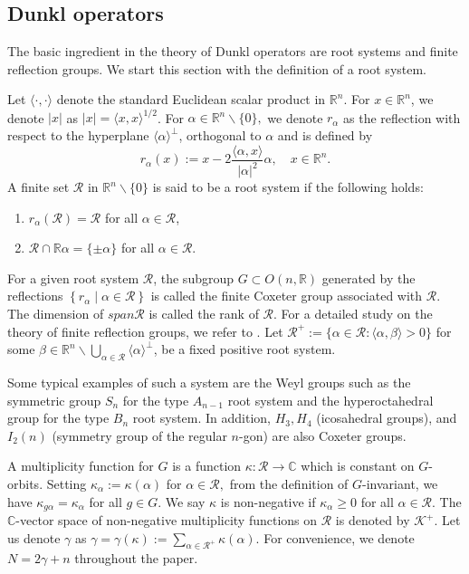 \documentclass[a4paper,11pt, reqno]{amsart}
\numberwithin{equation}{section}
\theoremstyle{plain}
\theoremstyle{definition}
\theoremstyle{remark}
\begin{document}
	\subsection{Dunkl operators}\label{dunklop} The basic ingredient in the theory of Dunkl operators are root systems and finite reflection groups. We start this section with the definition of a root system. 
 
 Let $\langle\cdot, \cdot\rangle$  denote the standard Euclidean scalar product in $\mathbb{R}^{n}$. For $x \in \mathbb{R}^{n}$, we denote $|x|$ as $|x|=\langle x, x\rangle^{1 / 2}$.
	For $\alpha \in \mathbb{R}^{n} \backslash\{0\},$ we denote $r_{\alpha}$ as the reflection with respect to the hyperplane $\langle \alpha\rangle^{\perp}$, orthogonal to $\alpha$ and is defined by
	$$
	r_{\alpha}(x):=x-2 \frac{\langle \alpha, x\rangle}{|\alpha|^{2}} \alpha, \quad x \in \mathbb{R}^n.
	$$
	A finite set $\mathcal{R}$ in $\mathbb{R}^{n} \backslash\{0\}$ is  said to be a root system if the following holds:
	\begin{enumerate}
		\item $ r_{\alpha}(\mathcal{R})=\mathcal{R}$ for all $\alpha \in \mathcal{R}$,
		\item $\mathcal{R} \cap \mathbb{R} \alpha=\{\pm \alpha\}$ for all $\alpha \in \mathcal{R}$.
	\end{enumerate}
	For a given root system $\mathcal{R}$, the subgroup $G \subset O(n, \mathbb{R})$ generated by the reflections $\left\{r_{\alpha} \mid \alpha \in \mathcal{R}\right\}$ is called the finite Coxeter group associated with $\mathcal{R}$.  The dimension of $span \mathcal{R}$ is called the rank of $\mathcal{R}$.   For a detailed study on the theory of finite reflection groups, we refer to \cite{hum}. Let $\mathcal{R}^+:=\{\alpha\in\mathcal{R}:\langle\alpha,\beta\rangle>0\}$ for some $\beta\in\mathbb{R}^n\backslash\bigcup_{\alpha\in\mathcal{R}}\langle \alpha\rangle^{\perp}$,  be a fixed positive root system.  
	
	
	Some typical examples of such a system are the Weyl groups such as the symmetric group $S_{n}$ for the type $A_{n-1}$ root system and the hyperoctahedral group for the type $B_{n}$ root system. In addition, $H_{3}, H_{4}$ (icosahedral groups), and $I_{2}(n)$ (symmetry group of the regular $n$-gon) are also Coxeter groups. %
	
	
	A multiplicity function for $G$ is a function $\kappa: \mathcal{R} \rightarrow \mathbb{C}$ which is constant on $G$-orbits. Setting $\kappa_{\alpha}:=\kappa(\alpha)$ for $\alpha \in \mathcal{R},$  from the definition of $G$-invariant,  we have $\kappa_{g \alpha}=\kappa_{\alpha}$ for all $g \in G$.  We say $\kappa$ is non-negative if $\kappa_{\alpha} \geq 0$ for all $\alpha \in \mathcal{R}$. The $\mathbb{C}$-vector space of non-negative multiplicity functions on $\mathcal{R}$ is denoted by $\mathcal{K}^{+}$. Let us denote  $\gamma$ as $\gamma=\gamma(\kappa):=\sum\limits_{\alpha\in\mathcal{R}^+}\kappa(\alpha)$. For convenience, we denote $N=2\gamma+n$ throughout the paper. 
 
\end{document}

